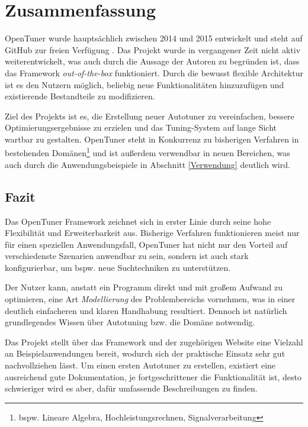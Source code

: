 \documentclass[a4paper,11pt]{scrartcl}
\newcommand{\bspw}{\mbox{bspw.}\xspace}
\newcommand{\bzw}{\mbox{bzw.}\xspace}
\begin{document}

\section{Zusammenfassung}
OpenTuner wurde hauptsächlich zwischen 2014 und 2015 entwickelt und steht auf GitHub 
zur freien Verfügung \cite{ghub}. Das Projekt wurde in vergangener Zeit nicht aktiv
weiterentwickelt, was auch durch die Aussage der Autoren zu begründen ist, dass das
Framework \emph{out-of-the-box} funktioniert. Durch die bewusst flexible Architektur
ist es den Nutzern möglich, beliebig neue Funktionalitäten hinzuzufügen und
existierende Bestandteile zu modifizieren. \newline

Ziel des Projekts ist es, die Erstellung neuer Autotuner zu vereinfachen, bessere
Optimierungsergebnisse zu erzielen und das Tuning-System auf lange Sicht wartbar
zu gestalten. OpenTuner steht in Konkurrenz zu bisherigen Verfahren in 
bestehenden Domänen\footnote{\bspw Lineare Algebra, Hochleistungsrechnen, Signalverarbeitung}
und ist außerdem verwendbar in neuen Bereichen, was auch durch die Anwendungsbeispiele in 
Abschnitt \ref{Verwendung} deutlich wird.

\subsection{Fazit}
Das OpenTuner Framework zeichnet sich in erster Linie durch seine hohe Flexibilität
und Erweiterbarkeit aus. Bisherige Verfahren funktionieren meist nur für einen speziellen
Anwendungsfall, OpenTuner hat nicht nur den Vorteil auf verschiedenste Szenarien anwendbar zu sein,
sondern ist auch stark konfigurierbar, um \bspw neue Suchtechniken zu unterstützen. \newline

Der Nutzer kann, anstatt ein Programm direkt und mit großem Aufwand zu optimieren,
eine Art \emph{Modellierung} des Problembereichs vornehmen, was in einer deutlich
einfacheren und klaren Handhabung resultiert. Dennoch ist natürlich grundlegendes
Wissen über Autotuning \bzw die Domäne notwendig. \newline

Das Projekt stellt über das Framework und der zugehörigen Website \cite{ot} eine
Vielzahl an Beispielanwendungen bereit, wodurch sich der praktische Einsatz sehr
gut nachvollziehen lässt. Um einen ersten Autotuner zu erstellen, existiert eine
ausreichend gute Dokumentation, je fortgeschrittener die Funktionalität ist,
desto schwieriger wird es aber, dafür umfassende Beschreibungen zu finden. \newline
\end{document}
